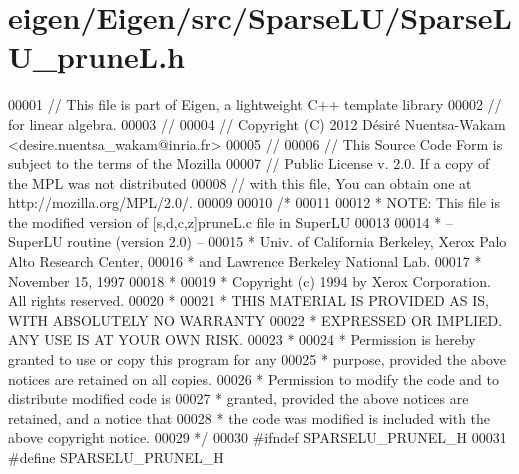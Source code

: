 \hypertarget{eigen_2_eigen_2src_2_sparse_l_u_2_sparse_l_u__prune_l_8h_source}{}\section{eigen/\+Eigen/src/\+Sparse\+L\+U/\+Sparse\+L\+U\+\_\+pruneL.h}
\label{eigen_2_eigen_2src_2_sparse_l_u_2_sparse_l_u__prune_l_8h_source}

\begin{DoxyCode}
00001 \textcolor{comment}{// This file is part of Eigen, a lightweight C++ template library}
00002 \textcolor{comment}{// for linear algebra.}
00003 \textcolor{comment}{//}
00004 \textcolor{comment}{// Copyright (C) 2012 Désiré Nuentsa-Wakam <desire.nuentsa\_wakam@inria.fr>}
00005 \textcolor{comment}{//}
00006 \textcolor{comment}{// This Source Code Form is subject to the terms of the Mozilla}
00007 \textcolor{comment}{// Public License v. 2.0. If a copy of the MPL was not distributed}
00008 \textcolor{comment}{// with this file, You can obtain one at http://mozilla.org/MPL/2.0/.}
00009 
00010 \textcolor{comment}{/* }
00011 \textcolor{comment}{ }
00012 \textcolor{comment}{ * NOTE: This file is the modified version of [s,d,c,z]pruneL.c file in SuperLU }
00013 \textcolor{comment}{ }
00014 \textcolor{comment}{ * -- SuperLU routine (version 2.0) --}
00015 \textcolor{comment}{ * Univ. of California Berkeley, Xerox Palo Alto Research Center,}
00016 \textcolor{comment}{ * and Lawrence Berkeley National Lab.}
00017 \textcolor{comment}{ * November 15, 1997}
00018 \textcolor{comment}{ *}
00019 \textcolor{comment}{ * Copyright (c) 1994 by Xerox Corporation.  All rights reserved.}
00020 \textcolor{comment}{ *}
00021 \textcolor{comment}{ * THIS MATERIAL IS PROVIDED AS IS, WITH ABSOLUTELY NO WARRANTY}
00022 \textcolor{comment}{ * EXPRESSED OR IMPLIED.  ANY USE IS AT YOUR OWN RISK.}
00023 \textcolor{comment}{ *}
00024 \textcolor{comment}{ * Permission is hereby granted to use or copy this program for any}
00025 \textcolor{comment}{ * purpose, provided the above notices are retained on all copies.}
00026 \textcolor{comment}{ * Permission to modify the code and to distribute modified code is}
00027 \textcolor{comment}{ * granted, provided the above notices are retained, and a notice that}
00028 \textcolor{comment}{ * the code was modified is included with the above copyright notice.}
00029 \textcolor{comment}{ */}
00030 \textcolor{preprocessor}{#ifndef SPARSELU\_PRUNEL\_H}
00031 \textcolor{preprocessor}{#define SPARSELU\_PRUNEL\_H}

\end{DoxyCode}
